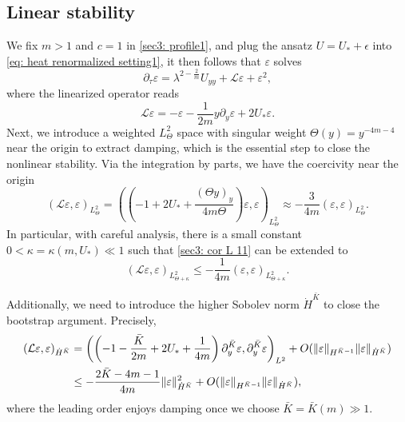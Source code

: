 \documentclass[12pt]{caltech_thesis}
\numberwithin{equation}{section}
\begin{document}
\subsection{Linear stability}
We fix $m>1$ and $c=1$ in \eqref{sec3: profile1}, and plug the ansatz  $U = U_* + \epsilon$ into \eqref{eq: heat renormalized setting1}, it then follows that $\varepsilon$ solves
\[
\partial_\tau \varepsilon= \lambda^{2-\frac{2}{m}} U_{yy} + \mathcal{L} \varepsilon+ \varepsilon^2,
\]
where the linearized operator reads
\begin{equation}
\mathcal{L}\varepsilon=-\varepsilon-\frac{1}{2m}y \partial_y \varepsilon +2U_*\varepsilon.
\label{sec: L1}
\end{equation}
Next, we introduce a weighted $L_\Theta^2$ space with singular weight $\Theta(y) = y^{-4m-4}$ near the origin to extract damping, which is the essential step to close the nonlinear stability. Via the integration by parts, we have the coercivity near the origin
\begin{equation}
\left( \mathcal{L} \varepsilon, \varepsilon\right)_{L_\Theta^2}
= \left( \left( -1 + 2U_* + \frac{(\Theta y)_y}{4 m \Theta} \right) \varepsilon, \varepsilon\right)_{L_{\Theta}^2} 
\approx  - \frac{3}{4m} \left(\varepsilon, \varepsilon\right)_{L_{\Theta}^2}.
\label{sec3: cor L 11}
\end{equation}
In particular, with careful analysis, there is a small constant $0< \kappa = \kappa(m,U_*) \ll 1$ such that \eqref{sec3: cor L 11} can be extended to
\begin{equation}
\left( \mathcal{L} \varepsilon, \varepsilon\right)_{L_{\Theta+\kappa}^2}
 \leq - \frac{1}{4m} \left(\varepsilon, \varepsilon\right)_{L_{\Theta+\kappa}^2}.
\label{sec3: cor L 21}
\end{equation}

Additionally, we need to introduce the higher Sobolev norm $\dot H^{\bar K}$ to close the bootstrap argument. Precisely,
\begin{align}
\left( \mathcal{L} \varepsilon, \varepsilon\right)_{\dot H^{\bar K}}
& =\left( \left(-1-\frac{\bar K}{2m}+2U_*+\frac{1}{4m} \right)\partial_y^{\bar K}\varepsilon, \partial_y^{\bar K}\varepsilon \right)_{L^2} + O(\| \varepsilon\|_{H^{\bar K-1}} \| \varepsilon\|_{\dot H^{\bar K}}) \notag \\
& \leq - \frac{2\bar K-4m-1}{4m} \| \varepsilon\|_{\dot H^{\bar K}}^2 + O(\| \varepsilon\|_{H^{{\bar K}-1}} \| \varepsilon\|_{\dot H^{\bar K}}),
\label{sec3: cor L 31}
\end{align}
where the leading order enjoys damping once we choose $\bar K = \bar K(m) \gg 1$.
\end{document}
